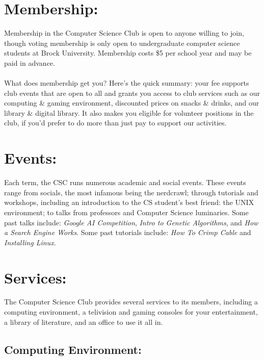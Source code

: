 \documentclass[10pt,letterpaper]{article}
\begin{document}
\pagestyle{empty}

\begin{multicols}{3}

\section*{Membership:}

Membership in the Computer Science Club is open to anyone willing to join,
though voting membership is only open to undergraduate computer science students at
Brock University. Membership costs \$5 per school year and may be paid in advance.\\
\\
What does membership get you? Here's the quick summary: your fee supports club events that are
open to all and grants you access to club services such as our computing \& gaming environment,
discounted prices on snacks \& drinks, and our library \& digital library.
It also makes you eligible for volunteer positions in the club,
if you'd prefer to do more than just pay to support our activities.

\section*{Events:} 

Each term, the CSC runs numerous academic and social events.
These events range from socials, the most infamous being the nerdcrawl;
through tutorials and workshops, including an introduction to the CS student's best
friend: the UNIX environment; to talks from professors and Computer Science
luminaries. Some past talks include: \emph{Google AI Competition},
\emph{Intro to Genetic Algorithms}, and \emph{How a Search Engine Works}.
Some past tutorials include: \emph{How To Crimp Cable} and \emph{Installing Linux}.


\section*{Services:}

The Computer Science Club provides several services to its members, including
a computing environment, a telivision and gaming consoles
for your entertainment, a library of literature, and an office to use it all in.

\subsection*{Computing Environment:}


\end{multicols}
\end{document}
